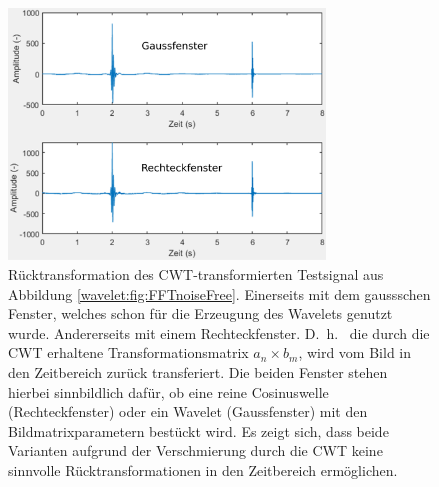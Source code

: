 \begin{figure}
	\centering
	\includegraphics[width=0.75\textwidth]{papers/wavelets/images/19-1_ICWT.png}
	\caption{Rücktransformation des CWT-transformierten Testsignal aus Abbildung \ref{wavelet:fig:FFTnoiseFree}. Einerseits mit dem gaussschen Fenster, welches schon für die Erzeugung des Wavelets genutzt wurde. Andererseits mit einem Rechteckfenster. D.~h.~ die durch die CWT erhaltene Transformationsmatrix $a_n \times b_m$, wird vom Bild in den Zeitbereich zurück transferiert. Die beiden Fenster stehen hierbei sinnbildlich dafür, ob eine reine Cosinuswelle (Rechteckfenster) oder ein Wavelet (Gaussfenster) mit den Bildmatrixparametern bestückt wird.
	Es zeigt sich, dass beide Varianten aufgrund der Verschmierung durch die CWT keine sinnvolle Rücktransformationen in den Zeitbereich ermöglichen.}
	\label{wavelet:fig:ICWT}
\end{figure}